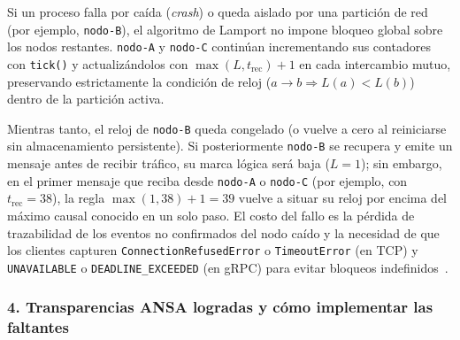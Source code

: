 Si un proceso falla por caída (\emph{crash}) o queda aislado por una partición de red (por ejemplo, \texttt{nodo-B}), el algoritmo de Lamport no impone bloqueo global sobre los nodos restantes. \texttt{nodo-A} y \texttt{nodo-C} continúan incrementando sus contadores con \texttt{tick()} y actualizándolos con $\operatorname{max}(L, t_{\mathrm{rec}}) + 1$ en cada intercambio mutuo, preservando estrictamente la condición de reloj ($a \rightarrow b \Rightarrow L(a) < L(b)$) dentro de la partición activa.

Mientras tanto, el reloj de \texttt{nodo-B} queda congelado (o vuelve a cero al reiniciarse sin almacenamiento persistente). Si posteriormente \texttt{nodo-B} se recupera y emite un mensaje antes de recibir tráfico, su marca lógica será baja ($L = 1$); sin embargo, en el primer mensaje que reciba desde \texttt{nodo-A} o \texttt{nodo-C} (por ejemplo, con $t_{\mathrm{rec}} = 38$), la regla $\operatorname{max}(1, 38) + 1 = 39$ vuelve a situar su reloj por encima del máximo causal conocido en un solo paso. El costo del fallo es la pérdida de trazabilidad de los eventos no confirmados del nodo caído y la necesidad de que los clientes capturen \texttt{ConnectionRefusedError} o \texttt{TimeoutError} (en TCP) y \texttt{UNAVAILABLE} o \texttt{DEADLINE\_EXCEEDED} (en gRPC) para evitar bloqueos indefinidos~\cite{mohammad2025resilient}.

\subsubsection{4. Transparencias ANSA logradas y cómo implementar las faltantes}

